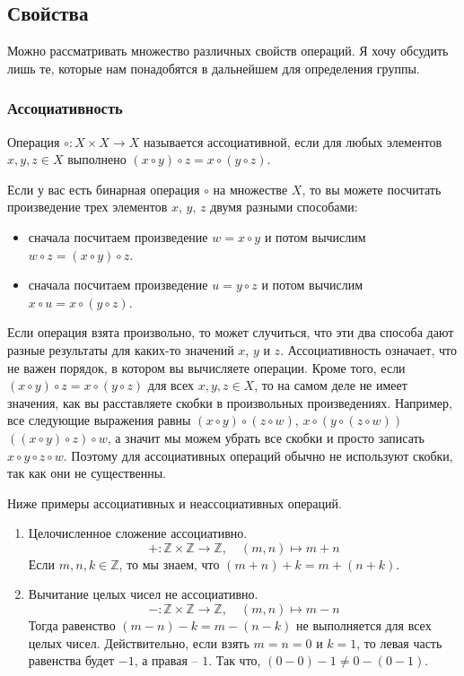 \subsection{Свойства}

Можно рассматривать множество различных свойств операций.
Я хочу обсудить лишь те, которые нам понадобятся в дальнейшем для определения группы.

\subsubsection{Ассоциативность}

\begin{definition}
Операция $\circ \colon X\times X\to X$ называется ассоциативной, если для любых элементов $x, y, z\in X$ выполнено $(x\circ y)\circ z = x\circ (y\circ z)$.
\end{definition}

Если у вас есть бинарная операция $\circ$ на множестве $X$, то вы можете посчитать произведение трех элементов $x$, $y$, $z$ двумя разными способами:
\begin{itemize}
\item сначала посчитаем произведение $w = x\circ y$ и потом вычислим $w \circ z = (x\circ y) \circ z$.

\item сначала посчитаем произведение $u = y \circ z$ и потом вычислим $x \circ u = x \circ (y\circ z)$.
\end{itemize}
Если операция взята произвольно, то может случиться, что эти два способа дают разные результаты для каких-то значений $x$, $y$ и $z$.
Ассоциативность означает, что не важен порядок, в котором вы вычисляете операции.
Кроме того, если $(x\circ y) \circ z = x \circ (y \circ z)$ для всех $x,y,z\in X$, то на самом деле не имеет значения, как вы расставляете скобки в произвольных произведениях.
Например, все следующие выражения равны $(x\circ y)\circ (z\circ w)$, $x\circ (y\circ (z\circ  w))$  $((x\circ  y)\circ z)\circ w$, а значит мы можем убрать все скобки и просто записать $x\circ  y \circ z \circ w$.
Поэтому для ассоциативных операций обычно не используют скобки, так как они не существенны.

\begin{examples}
Ниже примеры ассоциативных и неассоциативных операций.
\begin{enumerate}
\item Целочисленное сложение ассоциативно.
\[
+\colon \mathbb Z\times \mathbb Z\to \mathbb Z,\quad (m,n)\mapsto m+n
\]
Если $m,n,k\in \mathbb Z$, то мы знаем, что $(m + n) + k = m + (n + k)$.

\item Вычитание целых чисел не ассоциативно.
\[
-\colon \mathbb Z\times \mathbb Z\to \mathbb Z,\quad (m,n)\mapsto m-n
\]
Тогда равенство $(m - n) - k = m - (n - k)$ не выполняется для всех целых чисел.
Действительно, если взять $m = n = 0$ и $k = 1$, то левая часть равенства будет $-1$, а правая -- $1$.
Так что, $(0 - 0) - 1 \neq 0 - (0 - 1)$.
\end{enumerate}
\end{examples}

